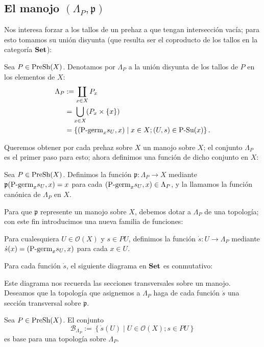 \subsection{El manojo $(\Lambda_P,\mathfrak{p})$}
Nos interesa forzar a los tallos de un prehaz a que tengan intersección vacía; para esto tomamos su unión disyunta (que resulta ser el coproducto de los tallos en la categoría $\normalfont{\textbf{Set}}$):
\begin{Def}
   Sea $P\in\normalfont{\text{PreSh}}(X)$. Denotamos por $\Lambda_P$ a la unión disyunta de los tallos de $P$ en los elementos de $X$:
   $$
   \begin{aligned}
      \Lambda_P&:=\coprod_{x\in X}P_{x}\\
               &=\bigcup_{x\in X}(P_{x}\times\left\lbrace x\right\rbrace)\\
               &=\left\lbrace (\normalfont{\text{P-germ}}_{x}s_{U},x)\mid x\in X;(U,s)\in\normalfont{\text{P-Su}}(x)\right\rbrace.
   \end{aligned}
   $$
\end{Def}
Queremos obtener por cada prehaz sobre $X$ un manojo sobre $X$; el conjunto $\Lambda_P$ es el primer paso para esto; ahora definimos una función de dicho conjunto en $X$:
\begin{Def}
   Sea $P\in\normalfont{\text{PreSh}}(X)$. Definimos la función $\mathfrak{p}:\Lambda_P\to X$ mediante $\mathfrak{p}(\normalfont{\text{P-germ}}_{x}s_{U},x)=x$ para cada $(\normalfont{\text{P-germ}}_{x}s_{U},x)\in\Lambda_P$, y la llamamos la función canónica de $\Lambda_P$ en $X$. 
\end{Def}
Para que $\mathfrak{p}$ represente un manojo sobre $X$, debemos dotar a $\Lambda_P$ de una topología; con este fin introducimos una nueva familia de funciones:
\begin{Def}
   Para cualesquiera $U\in\mathcal{O}(X)$ y $s\in PU$, definimos la función $\dot{s}:U\to\Lambda_P$ mediante $\dot{s}(x)=(\normalfont{\text{P-germ}}_{x}s_{U},x)$ para cada $x\in U$.
\end{Def}
Para cada función $\dot{s}$, el siguiente diagrama en $\normalfont{\textbf{Set}}$ es conmutativo:
   
Este diagrama nos recuerda las secciones transversales sobre un manojo. Deseamos que la topología que asignemos a $\Lambda_P$ haga de cada función $\dot{s}$ una sección transversal sobre $\mathfrak{p}$.
\begin{Prop}
   Sea $P\in\normalfont{\text{PreSh}}(X)$. El conjunto
   $$
      \mathcal{B}_{\Lambda_P}:=\left\lbrace \dot{s}(U)\mid U\in\mathcal{O}(X);s\in PU\right\rbrace
   $$
   es base para una topología sobre $\Lambda_P$.
\end{Prop}
